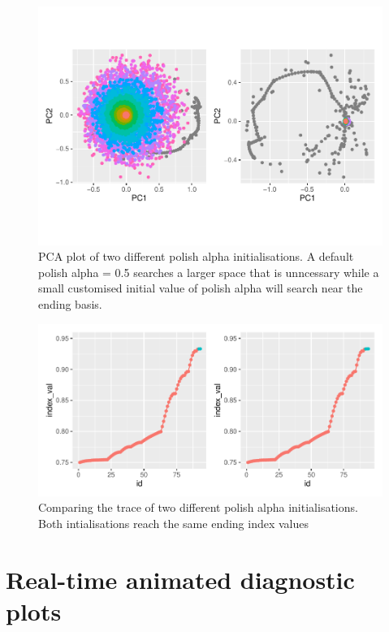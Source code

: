 \documentclass[12pt]{article}
\begin{document}
\begin{figure}
\centering
\includegraphics{paper_files/figure-latex/polish-alpha-1.pdf}
\caption{PCA plot of two different polish alpha initialisations. A
default polish alpha = 0.5 searches a larger space that is unncessary
while a small customised initial value of polish alpha will search near
the ending basis.}
\end{figure}

\begin{figure}
\centering
\includegraphics{paper_files/figure-latex/polish-alpha-tracing-1.pdf}
\caption{Comparing the trace of two different polish alpha
initialisations. Both intialisations reach the same ending index values}
\end{figure}

\hypertarget{real-time-animated-diagnostic-plots}{%
\section{Real-time animated diagnostic
plots}\label{real-time-animated-diagnostic-plots}}
\end{document}
